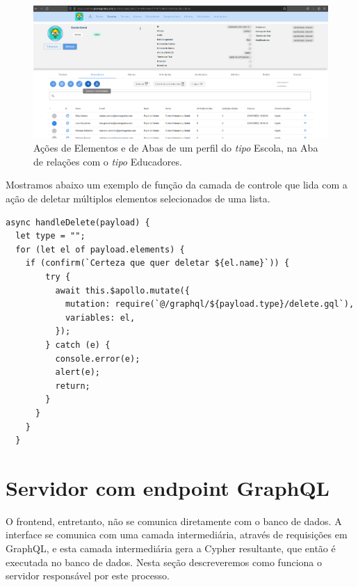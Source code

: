 \begin{figure}
    \centering
    \includegraphics[width=1\linewidth]{Imagens/chap04/front-other-actions.png}
    \caption{Ações de Elementos e de Abas de um perfil do \textit{tipo} Escola, na Aba de relações com o \textit{tipo} Educadores.}
    \label{fig:enter-label}
\end{figure}

Mostramos abaixo um exemplo de função da camada de controle que lida com a ação de deletar múltiplos elementos selecionados de uma lista.

\begin{lstlisting}
async handleDelete(payload) {
  let type = "";
  for (let el of payload.elements) {
    if (confirm(`Certeza que quer deletar ${el.name}`)) {
        try {
          await this.$apollo.mutate({
            mutation: require(`@/graphql/${payload.type}/delete.gql`),
            variables: el,
          });
        } catch (e) {
          console.error(e);
          alert(e);
          return;
        }
      }
    }
  }
\end{lstlisting}

\section{Servidor com endpoint GraphQL}

O frontend, entretanto, não se comunica diretamente com o banco de dados. A interface se comunica com uma camada intermediária, através de requisições em GraphQL, e esta camada intermediária gera a Cypher resultante, que então é executada no banco de dados. Nesta seção descreveremos como funciona o servidor responsável por este processo.

